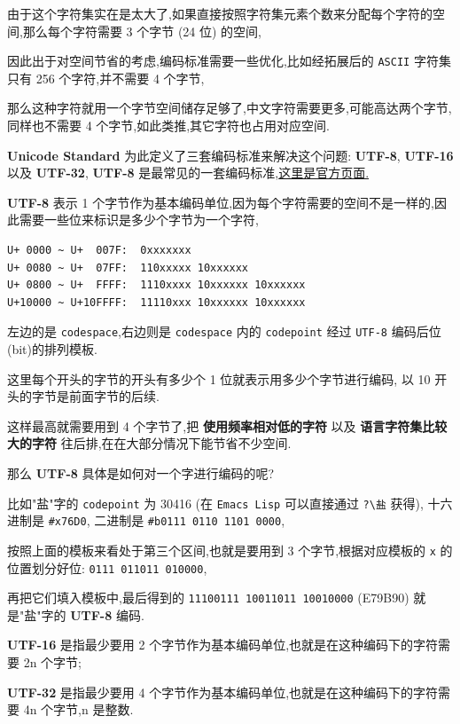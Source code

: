 \documentclass[11pt]{article}
\begin{document}
由于这个字符集实在是太大了,如果直接按照字符集元素个数来分配每个字符的空间,那么每个字符需要 3 个字节 (24 位) 的空间,

因此出于对空间节省的考虑,编码标准需要一些优化,比如经拓展后的 \texttt{ASCII} 字符集只有 256 个字符,并不需要 4 个字节,

那么这种字符就用一个字节空间储存足够了,中文字符需要更多,可能高达两个字节,同样也不需要 4 个字节,如此类推,其它字符也占用对应空间.

\textbf{Unicode Standard} 为此定义了三套编码标准来解决这个问题: \textbf{UTF-8}, \textbf{UTF-16} 以及 \textbf{UTF-32}, \textbf{UTF-8} 是最常见的一套编码标准,\href{https://www.unicode.org/standard/principles.html}{这里是官方页面.}

\textbf{UTF-8} 表示 1 个字节作为基本编码单位,因为每个字符需要的空间不是一样的,因此需要一些位来标识是多少个字节为一个字符,

\begin{verbatim}
U+ 0000 ~ U+  007F:  0xxxxxxx
U+ 0080 ~ U+  07FF:  110xxxxx 10xxxxxx
U+ 0800 ~ U+  FFFF:  1110xxxx 10xxxxxx 10xxxxxx
U+10000 ~ U+10FFFF:  11110xxx 10xxxxxx 10xxxxxx
\end{verbatim}

左边的是 \texttt{codespace},右边则是 \texttt{codespace} 内的 \texttt{codepoint} 经过 \texttt{UTF-8} 编码后位(bit)的排列模板.

这里每个开头的字节的开头有多少个 1 位就表示用多少个字节进行编码, 以 10 开头的字节是前面字节的后续.

这样最高就需要用到 4 个字节了,把 \textbf{使用频率相对低的字符} 以及 \textbf{语言字符集比较大的字符} 往后排,在在大部分情况下能节省不少空间.

那么 \textbf{UTF-8} 具体是如何对一个字进行编码的呢?

比如"盐"字的 \texttt{codepoint} 为 30416 (在 \texttt{Emacs Lisp} 可以直接通过 \texttt{?\textbackslash{}盐} 获得), 十六进制是 \texttt{\#x76D0}, 二进制是 \texttt{\#b0111 0110 1101 0000},

按照上面的模板来看处于第三个区间,也就是要用到 3 个字节,根据对应模板的 \texttt{x} 的位置划分好位: \texttt{0111 011011 010000},

再把它们填入模板中,最后得到的 \texttt{11100111 10011011 10010000} (E79B90) 就是"盐"字的 \textbf{UTF-8} 编码.

\textbf{UTF-16} 是指最少要用 2 个字节作为基本编码单位,也就是在这种编码下的字符需要 2n 个字节;

\textbf{UTF-32} 是指最少要用 4 个字节作为基本编码单位,也就是在这种编码下的字符需要 4n 个字节,n 是整数.
\end{document}
